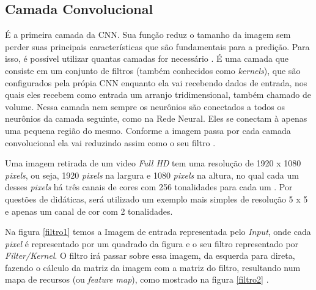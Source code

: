 \subsection{Camada Convolucional}

É a primeira camada da CNN. Sua função reduz o tamanho da imagem sem perder suas principais características que são fundamentais para a predição. Para isso, é possível utilizar quantas camadas for necessário \cite{freecodecamp}. É uma camada que consiste em um conjunto de filtros (também conhecidos como \textit{kernels}), que são configurados pela própia CNN enquanto ela vai recebendo dados de entrada, nos quais eles recebem como entrada um arranjo tridimensional, também chamado de volume. Nessa camada nem sempre os neurônios são conectados a todos os neurônios da camada seguinte, como na Rede Neural. Eles se conectam à apenas uma pequena região do mesmo. Conforme a imagem passa por cada camada convolucional ela vai reduzindo assim como o seu filtro \cite{freecodecamp, conv2}.
 
 Uma imagem retirada de um video \textit{Full HD} tem uma resolução de 1920 x 1080 \textit{pixels}, ou seja, 1920 \textit{pixels} na largura e 1080 \textit{pixels} na altura, no qual cada um desses \textit{pixels} há três canais de cores com 256 tonalidades para cada um \cite{resolucao}. Por questões de didáticas, será utilizado um exemplo mais simples de resolução 5 x 5 e apenas um canal de cor com 2 tonalidades.
 \begin{figure}[H]
	\centering
\end{figure}

Na figura \ref{filtro1} temos a Imagem de entrada representada pelo \textit{Input}, onde cada \textit{pixel} é representado por um quadrado da figura e o seu filtro representado por \textit{Filter/Kernel}. O filtro irá passar sobre essa imagem, da esquerda para direta, fazendo o cálculo da matriz da imagem com a matriz do filtro, resultando num mapa de recursos (ou \textit{feature map}), como mostrado na figura \ref{filtro2} \cite{conv2}.

